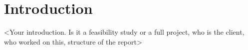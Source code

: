 \section{Introduction}
\label{sec:intro}
<Your introduction. Is it a feasibility study or a full project, who is the client, who worked on this, structure of the report>